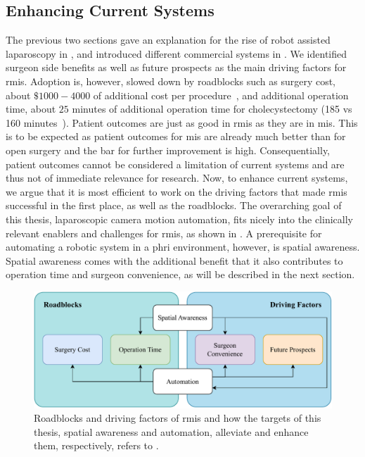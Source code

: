 \subsection{Enhancing Current Systems}
\label{in:sec:enhancing_current_systems}
The previous two sections gave an explanation for the rise of robot assisted laparoscopy in , and introduced different commercial systems in . We identified surgeon side benefits as well as future prospects as the main driving factors for \gls{rmis}. Adoption is, however, slowed down by roadblocks such as surgery cost, about $\$1000-4000$ of additional cost per procedure~\cite{neumann2018qalys}, and additional operation time, about $25$ minutes of additional operation time for cholecystectomy (185 vs 160 minutes~\cite{kane2020robotic}). Patient outcomes are just as good in \gls{rmis} as they are in \gls{mis}. This is to be expected as patient outcomes for \gls{mis} are already much better than for open surgery and the bar for further improvement is high. Consequentially, patient outcomes cannot be considered a limitation of current systems and are thus not of immediate relevance for research. Now, to enhance current systems, we argue that it is most efficient to work on the driving factors that made \gls{rmis} successful in the first place, as well as the roadblocks. The overarching goal of this thesis, laparoscopic camera motion automation, fits nicely into the clinically relevant enablers and challenges for \gls{rmis}, as shown in . A prerequisite for automating a robotic system in a \gls{phri} environment, however, is spatial awareness. Spatial awareness comes with the additional benefit that it also contributes to operation time and surgeon convenience, as will be described in the next section.
\begin{figure}[tb]
    \centering
    \includegraphics[width=\textwidth]{introduction/fig/main_goals.pdf}
    \caption{Roadblocks and driving factors of \gls{rmis} and how the targets of this thesis, spatial awareness and automation, alleviate and enhance them, respectively, refers to .}
    \label{in:fig:advancing_robotic_laparoscopy}
\end{figure}

